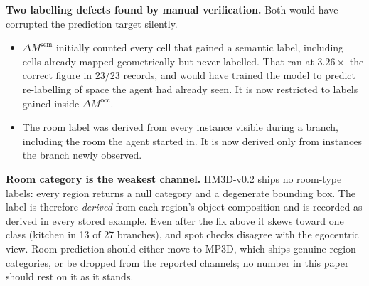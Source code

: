 \documentclass[10pt,twocolumn]{article}
\begin{document}
\textbf{Two labelling defects found by manual verification.} Both would have
corrupted the prediction target silently.
\begin{itemize}
    \item \(\Delta M^{\mathrm{sem}}\) initially counted every cell that gained
    a semantic label, including cells already mapped geometrically but never
    labelled. That ran at \(3.26\times\) the correct figure in \(23/23\)
    records, and would have trained the model to predict re-labelling of space
    the agent had already seen. It is now restricted to labels gained inside
    \(\Delta M^{\mathrm{occ}}\).
    \item The room label was derived from every instance visible during a
    branch, including the room the agent started in. It is now derived only
    from instances the branch newly observed.
\end{itemize}

\textbf{Room category is the weakest channel.} HM3D-v0.2 ships no room-type
labels: every region returns a null category and a degenerate bounding box. The
label is therefore \emph{derived} from each region's object composition and is
recorded as derived in every stored example. Even after the fix above it skews
toward one class (kitchen in 13 of 27 branches), and spot checks disagree with
the egocentric view. Room prediction should either move to MP3D, which ships
genuine region categories, or be dropped from the reported channels; no number
in this paper should rest on it as it stands.
\end{document}
